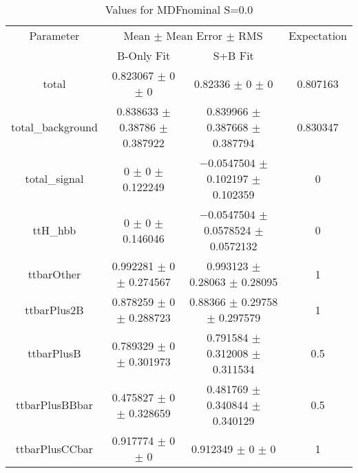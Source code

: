\begin{table}
\centering
\caption{Values for MDFnominal S=0.0}
\begin{tabular}{cccc}
\toprule
Parameter & \multicolumn{2}{c}{Mean $\pm$ Mean Error $\pm$ RMS} & Expectation\\
 & B-Only Fit & S+B Fit & \\
\midrule
total & \num{0.823067} $\pm$ \num{0} $\pm$ \num{0} & \num{0.82336} $\pm$ \num{0} $\pm$ \num{0} & \num{0.807163}\\
total\_background & \num{0.838633} $\pm$ \num{0.38786} $\pm$ \num{0.387922} & \num{0.839966} $\pm$ \num{0.387668} $\pm$ \num{0.387794} & \num{0.830347}\\
total\_signal & \num{0} $\pm$ \num{0} $\pm$ \num{0.122249} & \num{-0.0547504} $\pm$ \num{0.102197} $\pm$ \num{0.102359} & \num{0}\\
ttH\_hbb & \num{0} $\pm$ \num{0} $\pm$ \num{0.146046} & \num{-0.0547504} $\pm$ \num{0.0578524} $\pm$ \num{0.0572132} & \num{0}\\
ttbarOther & \num{0.992281} $\pm$ \num{0} $\pm$ \num{0.274567} & \num{0.993123} $\pm$ \num{0.28063} $\pm$ \num{0.28095} & \num{1}\\
ttbarPlus2B & \num{0.878259} $\pm$ \num{0} $\pm$ \num{0.288723} & \num{0.88366} $\pm$ \num{0.29758} $\pm$ \num{0.297579} & \num{1}\\
ttbarPlusB & \num{0.789329} $\pm$ \num{0} $\pm$ \num{0.301973} & \num{0.791584} $\pm$ \num{0.312008} $\pm$ \num{0.311534} & \num{0.5}\\
ttbarPlusBBbar & \num{0.475827} $\pm$ \num{0} $\pm$ \num{0.328659} & \num{0.481769} $\pm$ \num{0.340844} $\pm$ \num{0.340129} & \num{0.5}\\
ttbarPlusCCbar & \num{0.917774} $\pm$ \num{0} $\pm$ \num{0} & \num{0.912349} $\pm$ \num{0} $\pm$ \num{0} & \num{1}\\
\bottomrule
\end{tabular}
\end{table}
